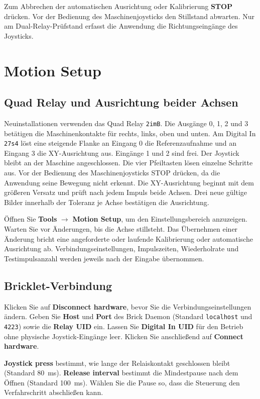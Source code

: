 \documentclass[a4paper,11pt]{article}
\begin{document}
Zum Abbrechen der automatischen Ausrichtung oder Kalibrierung \textbf{STOP} drücken. Vor der Bedienung des Maschinenjoysticks den Stillstand abwarten. Nur am Dual-Relay-Prüfstand erfasst die Anwendung die Richtungseingänge des Joysticks.

\newpage
\section{Motion Setup}
\label{sec:motion-setup}
\subsection{Quad Relay und Ausrichtung beider Achsen}
Neuinstallationen verwenden das Quad Relay \texttt{2imB}. Die Ausgänge 0, 1, 2
und 3 betätigen die Maschinenkontakte für rechts, links, oben und unten.
Am Digital In \texttt{27s4} löst eine steigende Flanke an Eingang 0 die
Referenzaufnahme und an Eingang 3 die XY-Ausrichtung aus. Eingänge 1 und 2 sind frei.
Der Joystick bleibt an der Maschine angeschlossen. Die vier Pfeiltasten lösen
einzelne Schritte aus. Vor der Bedienung des Maschinenjoysticks STOP drücken,
da die Anwendung seine Bewegung nicht erkennt.
Die XY-Ausrichtung beginnt mit dem größeren Versatz und prüft nach jedem Impuls
beide Achsen. Drei neue gültige Bilder innerhalb der Toleranz je Achse bestätigen
die Ausrichtung.

Öffnen Sie \textbf{Tools} $\rightarrow$ \textbf{Motion Setup}, um den
Einstellungsbereich anzuzeigen. Warten Sie vor Änderungen, bis die Achse
stillsteht. Das Übernehmen einer Änderung bricht eine angeforderte oder laufende
Kalibrierung oder automatische Ausrichtung ab. Verbindungseinstellungen,
Impulszeiten, Wiederholrate und Testimpulsanzahl werden jeweils nach der Eingabe
übernommen.

\subsection{Bricklet-Verbindung}

Klicken Sie auf \textbf{Disconnect hardware}, bevor Sie die
Verbindungseinstellungen ändern. Geben Sie \textbf{Host} und
\textbf{Port} des Brick Daemon (Standard \texttt{localhost} und \texttt{4223})
sowie die \textbf{Relay UID} ein. Lassen Sie \textbf{Digital In UID} für
den Betrieb ohne physische Joystick-Eingänge leer. Klicken Sie anschließend
auf \textbf{Connect hardware}.

\textbf{Joystick press} bestimmt, wie lange der Relaiskontakt geschlossen
bleibt (Standard 80~ms). \textbf{Release interval} bestimmt die Mindestpause
nach dem Öffnen (Standard 100~ms). Wählen Sie die Pause so, dass die
Steuerung den Verfahrschritt abschließen kann.
\end{document}
